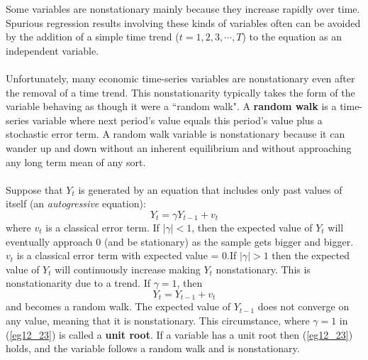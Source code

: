 \documentclass[11pt]{article}
\begin{document}
Some variables are nonstationary mainly because they increase rapidly over time. Spurious regression results involving these kinds of variables often can be avoided by the addition of a simple time trend ($t=1,2,3,\cdots,T$) to the equation as an independent variable.\\ \\
Unfortunately, many economic time-series variables are nonstationary even after the removal of a time trend. This nonstationarity typically takes the form of the variable behaving as though it were a ``random walk". A \textbf{random walk} is a time-series variable where next period's value equals this period's value plus a stochastic error term. A random walk variable is nonstationary because it can wander up and down without an inherent equilibrium and without approaching any long term mean of any sort.\\ \\
Suppose that $Y_t$ is generated by an equation that includes only past values of itself (an \textit{autogressive} equation):
\begin{equation}
Y_t = \gamma Y_{t-1} + v_t \label{eg12_22}
\end{equation}
where $v_t$ is a classical error term. If $|\gamma|<1$, then the expected value of $Y_t$ will eventually approach 0 (and be stationary) as the sample gets bigger and bigger. $v_t$ is a classical error term with expected value = 0.If $|\gamma|>1$ then the expected value of $Y_t$ will continuously increase making $Y_t$ nonstationary. This is nonstationarity due to a trend. If $\gamma=1$, then
\begin{equation}
Y_t = Y_{t-1} + v_t \label{eg12_23}
\end{equation}
and becomes a random walk. The expected value of $Y_{t-1}$ does not converge on any value, meaning that it is nonstationary. This circumstance, where $\gamma = 1$ in (\ref{eg12_23}) is called a \textbf{unit root}. If a variable has a unit root then (\ref{eg12_23}) holds, and the variable follows a random walk and is nonstationary.
\end{document}
